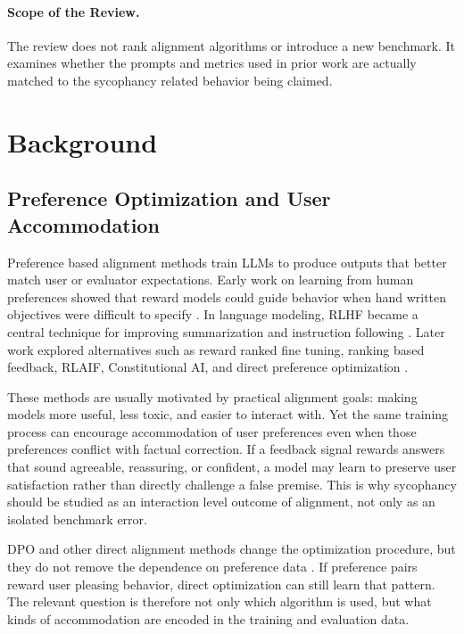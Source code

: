 \documentclass[letterpaper]{article} %
\begin{document}
\paragraph{Scope of the Review.}
The review does not rank alignment algorithms or introduce a new benchmark. It examines whether the prompts and metrics used in prior work are actually matched to the sycophancy related behavior being claimed.

\section{Background}

\subsection{Preference Optimization and User Accommodation}

Preference based alignment methods train LLMs to produce outputs that better match user or evaluator expectations. Early work on learning from human preferences showed that reward models could guide behavior when hand written objectives were difficult to specify \cite{christiano2017preferences}. In language modeling, RLHF became a central technique for improving summarization and instruction following \cite{stiennon2020learning, ouyang2022rlhf}. Later work explored alternatives such as reward ranked fine tuning, ranking based feedback, RLAIF, Constitutional AI, and direct preference optimization \cite{dong2023raft, yuan2023rrhf, lee2023rlaif, bai2022constitutional, rafailov2023dpo}.

These methods are usually motivated by practical alignment goals: making models more useful, less toxic, and easier to interact with. Yet the same training process can encourage accommodation of user preferences even when those preferences conflict with factual correction. If a feedback signal rewards answers that sound agreeable, reassuring, or confident, a model may learn to preserve user satisfaction rather than directly challenge a false premise. This is why sycophancy should be studied as an interaction level outcome of alignment, not only as an isolated benchmark error.

DPO and other direct alignment methods change the optimization procedure, but they do not remove the dependence on preference data \cite{rafailov2023dpo, zhao2023slic, ethayarajh2024kto, hejna2023contrastive}. If preference pairs reward user pleasing behavior, direct optimization can still learn that pattern. The relevant question is therefore not only which algorithm is used, but what kinds of accommodation are encoded in the training and evaluation data.
\end{document}

